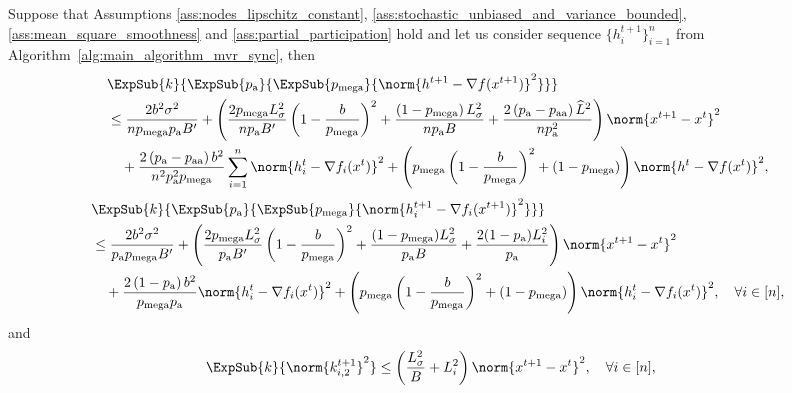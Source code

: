 \documentclass{article}
\newcommand*{\probavailable}{\ensuremath{p_{\textnormal{a}}}}
\newcommand*{\probpairaa}{\ensuremath{p_{\textnormal{aa}}}}
\newcommand*{\probmega}{\ensuremath{p_{\text{mega}}}}
\begin{document}
\begin{lemma}
  \label{lemma:sync_mvr}
  Suppose that Assumptions \ref{ass:nodes_lipschitz_constant}, \ref{ass:stochastic_unbiased_and_variance_bounded}, \ref{ass:mean_square_smoothness} and \ref{ass:partial_participation} hold and let us consider sequence $\{h^{t+1}_i\}_{i=1}^n$ from Algorithm~\ref{alg:main_algorithm_mvr_sync}, then
  \begin{align*}
    &\ExpSub{k}{\ExpSub{\probavailable}{\ExpSub{\probmega}{\norm{h^{t+1} - \nabla f(x^{t+1})}^2}}} \nonumber\\
    &\leq \frac{2 b^2 \sigma^2}{n \probmega \probavailable B'} + \left(\frac{2 \probmega L_{\sigma}^2}{n \probavailable B'}\left(1 - \frac{b}{\probmega}\right)^2 + \frac{\left(1 - \probmega\right)L_{\sigma}^2}{n \probavailable B} + \frac{2\left(\probavailable - \probpairaa\right) \widehat{L}^2}{n \probavailable^2}\right)\norm{x^{t+1} - x^{t}}^2 \nonumber\\
    &\quad + \frac{2\left(\probavailable - \probpairaa\right) b^2}{n^2 \probavailable^2 \probmega}\sum_{i=1}^n\norm{h^t_i -  \nabla f_i(x^{t})}^2 + \left(\probmega \left(1 - \frac{b}{\probmega}\right)^2 + (1 - \probmega)\right) \norm{h^{t} - \nabla f(x^{t})}^2,
  \end{align*}
  \begin{align*}
    &\ExpSub{k}{\ExpSub{\probavailable}{\ExpSub{\probmega}{\norm{h^{t+1}_i - \nabla f_i(x^{t+1})}^2}}} \\
    &\leq \frac{2 b^2 \sigma^2}{\probavailable \probmega B'} + \left(\frac{2 \probmega L_{\sigma}^2}{\probavailable B'}\left(1 - \frac{b}{\probmega}\right)^2 + \frac{(1 - \probmega) L_{\sigma}^2}{\probavailable B} + \frac{2(1 - \probavailable) L_{i}^2}{\probavailable}\right) \norm{x^{t+1} - x^{t}}^2 \\
    &\quad + \frac{2\left(1 - \probavailable\right)b^2}{\probmega \probavailable} \norm{h^t_i - \nabla f_i(x^{t})}^2 + \left(\probmega \left(1 - \frac{b}{\probmega}\right)^2 + (1 - \probmega)\right) \norm{h^{t}_i - \nabla f_i(x^{t})}^2, \quad \forall i \in [n],
  \end{align*}
  and 
  \begin{align*}
    &\ExpSub{k}{\norm{k^{t+1}_{i, 2}}^2} \leq \left(\frac{L_{\sigma}^2}{B} + L_{i}^2\right) \norm{x^{t+1} - x^{t}}^2,  \quad \forall i \in [n],
  \end{align*}
\end{lemma}
\end{document}
